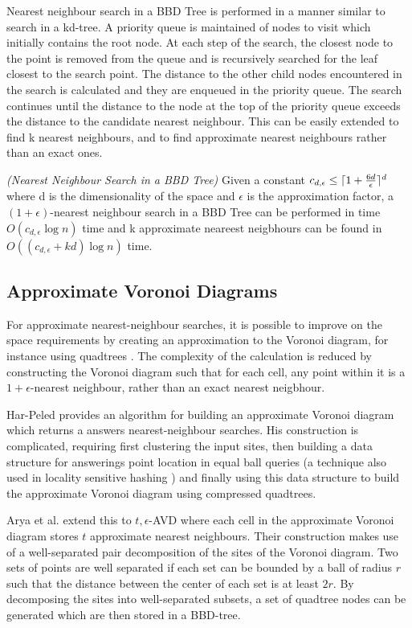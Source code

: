 \documentclass[mcs]{scsthesis}
\begin{document}
Nearest neighbour search in a BBD Tree is performed in a manner similar to
search in a kd-tree. A priority queue is maintained of nodes to visit which
initially contains the root node. At each step of the search, the closest
node to the point is removed from the queue and is recursively searched for
the leaf closest to the search point. The distance to the other child nodes
encountered in the search is calculated and they are enqueued in the priority
queue. The search continues until the distance to the node at the top of the
priority queue exceeds the distance to the candidate nearest neighbour. This
can be easily extended to find k nearest neighbours, and to find approximate
nearest neighbours rather than an exact ones.

\begin{thm} \emph{(Nearest Neighbour Search in a BBD Tree)} 
Given a constant \(c_{d,\epsilon} \le \lceil 1 + {6d \over \epsilon} \rceil^d\)
where d is the dimensionality of the space and \(\epsilon\) is the approximation
factor, a \((1 + \epsilon)\)-nearest neighbour search in a BBD Tree can be
performed in time \(O(c_{d,\epsilon} \log n)\) time and k approximate neareest
neigbhours can be found in \(O((c_{d,\epsilon} + kd) \log n)\) time.
\end{thm}

\subsection{Approximate Voronoi Diagrams}

For approximate nearest-neighbour searches, it is possible to improve on the
space requirements by creating an approximation to the Voronoi diagram, for
instance using quadtrees \cite{avd}. The complexity of the calculation is
reduced by constructing the Voronoi diagram such that for each cell, any point
within it is a \(1 + \epsilon\)-nearest neighbour, rather than an exact
nearest neigbhour.

Har-Peled \cite{avd} provides an algorithm for building an approximate
Voronoi diagram which returns a answers nearest-neighbour searches. His
construction is complicated, requiring first clustering the input sites, then
building a data structure for answerings point location in equal ball queries
(a technique also used in locality sensitive hashing \cite{lsh}) and finally
using this data structure to build the approximate Voronoi diagram using
compressed quadtrees.

Arya et al. \cite{arya-avd} extend this to \(t, \epsilon\)-AVD where each
cell in the approximate Voronoi diagram stores \(t\) approximate nearest
neighbours. Their construction makes use of a well-separated pair
decomposition of the sites of the Voronoi diagram. Two sets of points are well
separated if each set can be bounded by a ball of radius \(r\) such that the
distance between the center of each set is at least \(2r\). By decomposing
the sites into well-separated subsets, a set of quadtree nodes can be
generated which are then stored in a BBD-tree. 
\end{document}
